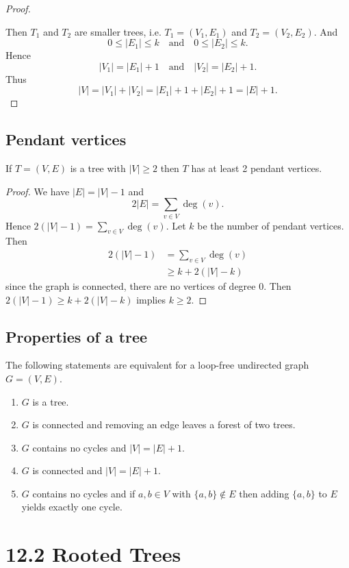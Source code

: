 \documentclass[11pt]{article}
\begin{document}
\begin{proof}
\begin{figure}[H]
        \end{figure}
        Then \(T_1\) and \(T_2\) are smaller trees, i.e. \(T_1 = (V_1, E_1)\) and \(T_2 = (V_2, E_2)\). And \[0 \leq |E_1| \leq k \quad \text{and} \quad 0 \leq |E_2| \leq k.\] Hence \[|V_1| = |E_1| + 1 \quad \text{and} \quad |V_2| = |E_2| + 1.\] Thus \[|V| = |V_1| + |V_2| = |E_1| + 1 + |E_2| + 1 = |E| + 1.\]
    \end{proof}

    \subsection{Pendant vertices}

    If \(T = (V,E)\) is a tree with \(|V| \geq 2\) then $T$ has at least 2 pendant vertices.
    \begin{proof}
        We have \(|E| = |V| - 1\) and \[2|E| = \sum_{v \in V} \deg(v).\] Hence \(2(|V| - 1) = \sum_{v \in V} \deg (v)\). Let $k$ be the number of pendant vertices. Then
        \begin{align*}
            2(|V| - 1) &= \sum_{v \in V} \deg(v) \\
                       &\geq k + 2 (|V| - k)
        \end{align*}
        since the graph is connected, there are no vertices of degree 0. Then \(2(|V| - 1) \geq k+2(|V| - k)\) implies \(k \geq 2\). 
    \end{proof}

    \subsection{Properties of a tree}

    The following statements are equivalent for a loop-free undirected graph \(G = (V,E)\).
    \begin{enumerate}
        \item $G$ is a tree.
        \item $G$ is connected and removing an edge leaves a forest of two trees.
        \item $G$ contains no cycles and \(|V| = |E| + 1\). 
        \item $G$ is connected and \(|V| = |E| + 1\).
        \item $G$ contains no cycles and if \(a,b \in V\) with \(\{a,b\} \notin E\) then adding \(\{a,b\}\) to $E$ yields exactly one cycle. 
    \end{enumerate}

    \section{12.2 Rooted Trees}
\end{document}
